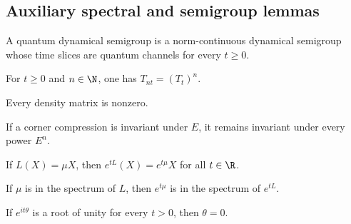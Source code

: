 \subsection{Auxiliary spectral and semigroup lemmas}

\begin{definition}
    \label{def:is_quantum_dyn_semigroup_ch12}
    \leanok
    A quantum dynamical semigroup is a norm-continuous dynamical semigroup whose
    time slices are quantum channels for every $t \ge 0$.
\end{definition}

\begin{theorem}
    \leanok
    For $t\ge 0$ and $n\in\N$, one has $T_{nt}=(T_t)^n$.
\end{theorem}

\begin{lemma}
    \leanok
    Every density matrix is nonzero.
\end{lemma}

\begin{theorem}
    \leanok
    If a corner compression is invariant under $E$, it remains invariant under
    every power $E^n$.
\end{theorem}

\begin{theorem}
    \leanok
    If $L(X)=\mu X$, then $e^{tL}(X)=e^{t\mu}X$ for all $t\in\R$.
\end{theorem}

\begin{theorem}
    \leanok
    If $\mu$ is in the spectrum of $L$, then $e^{t\mu}$ is in the spectrum
    of $e^{tL}$.
\end{theorem}

\begin{theorem}
    \leanok
    If $e^{it\theta}$ is a root of unity for every $t>0$, then $\theta=0$.
\end{theorem}


